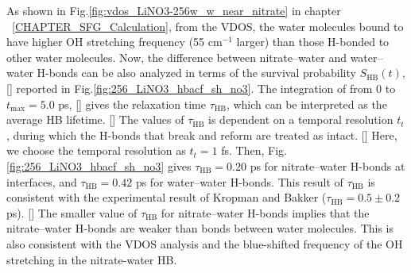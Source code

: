 As shown in Fig.\space\ref{fig:vdos_LiNO3-256w_w_near_nitrate} in chapter ~\ref{CHAPTER_SFG_Calculation}, 
from the VDOS, the water molecules bound to \nitrate have higher OH stretching frequency (55 cm$^{-1}$ larger) 
than those H-bonded to other water molecules. 
%
Now, the difference between nitrate--water and water--water H-bonds 
can be also analyzed in terms of the survival probability $S_{\text{HB}}(t)$, [\cite{AKS86,JT90,AL96}] 
reported in Fig.\thinspace\ref {fig:256_LiNO3_hbacf_sh_no3}.
The integration of \SHB from 0 to $t_{\max}=5.0$ ps, [\cite{Steinel2004}] gives the relaxation time $\tau_\text{HB}$, which can be interpreted as 
the average HB lifetime. [\cite{SC02}] 
The values of $\tau_{\text{HB}}$ is dependent on a temporal resolution $t_t$, during which the H-bonds that break and reform are treated as intact. [\cite{AL00}] 
%
Here, we choose the temporal resolution as $t_t=1$ fs. 
Then, Fig.\thinspace\ref {fig:256_LiNO3_hbacf_sh_no3} gives $\tau_\text{HB}=0.20$ ps for nitrate--water H-bonds at interfaces, and $\tau_\text{HB}=0.42$ ps for water--water H-bonds.
This result of $\tau_\text{HB}$ is consistent with the experimental result of Kropman and Bakker ($\tau_\text{HB}=0.5\pm0.2$ ps). [\cite{MFK01}]
The smaller value of $\tau_\text{HB}$ for nitrate--water H-bonds implies that the nitrate--water H-bonds are weaker than bonds between water molecules. 
This is also consistent with the VDOS analysis and the blue-shifted frequency of the OH stretching in the nitrate-water HB. 

\FloatBarrier

